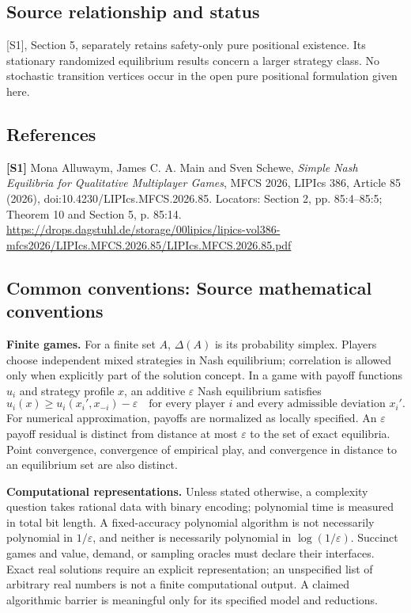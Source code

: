 \documentclass[11pt,a4paper]{article}
\begin{document}
\subsection*{Source relationship and status}
[S1], Section 5, separately retains safety-only pure positional existence. Its stationary randomized equilibrium results concern a larger strategy class. No stochastic transition vertices occur in the open pure positional formulation given here.
\subsection*{References}
\begingroup\footnotesize\raggedright
\textbf{[S1]} Mona Alluwaym, James C. A. Main and Sven Schewe, \emph{Simple Nash Equilibria for Qualitative Multiplayer Games}, MFCS 2026, LIPIcs 386, Article 85 (2026), doi:10.4230/LIPIcs.MFCS.2026.85. Locators: Section 2, pp. 85:4--85:5; Theorem 10 and Section 5, p. 85:14. \url{https://drops.dagstuhl.de/storage/00lipics/lipics-vol386-mfcs2026/LIPIcs.MFCS.2026.85/LIPIcs.MFCS.2026.85.pdf}
\par\endgroup

\subsection*{Common conventions: Source mathematical conventions}

\textbf{Finite games.} For a finite set $A$, $\Delta(A)$ is its probability
simplex. Players choose independent mixed strategies in Nash equilibrium;
correlation is allowed only when explicitly part of the solution concept.
In a game with payoff functions $u_i$ and strategy profile $x$, an additive
$\varepsilon$ Nash equilibrium satisfies
\[
 u_i(x)\geq u_i(x_i',x_{-i})-\varepsilon
 \quad\text{for every player $i$ and every admissible deviation $x_i'$}.
\]
For numerical approximation, payoffs are normalized as locally specified.
An $\varepsilon$ payoff residual is distinct from distance at most
$\varepsilon$ to the set of exact equilibria. Point convergence, convergence
of empirical play, and convergence in distance to an equilibrium set are
also distinct.

\textbf{Computational representations.} Unless stated otherwise, a complexity
question takes rational data with binary encoding; polynomial time is measured
in total bit length. A fixed-accuracy polynomial algorithm is not necessarily
polynomial in $1/\varepsilon$, and neither is necessarily polynomial in
$\log(1/\varepsilon)$. Succinct games and value, demand, or sampling oracles
must declare their interfaces. Exact real solutions require an explicit
representation; an unspecified list of arbitrary real numbers is not a
finite computational output. A claimed algorithmic barrier is meaningful
only for its specified model and reductions.
\end{document}
